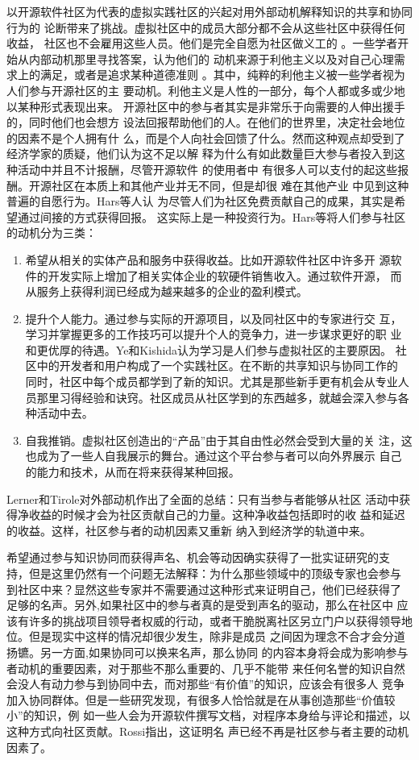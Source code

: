 以开源软件社区为代表的虚拟实践社区的兴起对用外部动机解释知识的共享和协同行为的
论断带来了挑战。虚拟社区中的成员大部分都不会从这些社区中获得任何收益，
社区也不会雇用这些人员。他们是完全自愿为社区做义工的
\cite{lerner2002sse}。一些学者开始从内部动机那里寻找答案，认为他们的
动机来源于利他主义以及对自己心理需求上的满足，或者是追求某种道德准则
\cite{Wu2007}。其中，纯粹的利他主义被一些学者视为人们参与开源社区的主
要动机。利他主义是人性的一部分，每个人都或多或少地以某种形式表现出来。
开源社区中的参与者其实是非常乐于向需要的人伸出援手的，同时他们也会想方
设法回报帮助他们的人。在他们的世界里，决定社会地位的因素不是个人拥有什
么，而是个人向社会回馈了什么\cite{raymond1999cab}。然而这种观点却受到了经济学家的质疑，他们认为这不足以解
释为什么有如此数量巨大参与者投入到这种活动中并且不计报酬，尽管开源软件
的使用者中
有很多人可以支付的起这些报酬。开源社区在本质上和其他产业并无不同，但是却很
难在其他产业 中见到这种普遍的自愿行为\cite{schmidt2002pso}。Hars等人认
为尽管人们为社区免费贡献自己的成果，其实是希望通过间接的方式获得回报。
这实际上是一种投资行为\cite{hars2002wfm}。Hars等将人们参与社区的动机分为三类：
\begin{enumerate}
\item  希望从相关的实体产品和服务中获得收益。比如开源软件社区中许多开
  源软件的开发实际上增加了相关实体企业的软硬件销售收入。通过软件开源，
  而从服务上获得利润已经成为越来越多的企业的盈利模式。
\item 提升个人能力。通过参与实际的开源项目，以及同社区中的专家进行交
  互，学习并掌握更多的工作技巧可以提升个人的竞争力，进一步谋求更好的职
  业和更优厚的待遇。Ye和Kishida认为学习是人们参与虚拟社区的主要原因。
  社区中的开发者和用户构成了一个实践社区。在不断的共享知识与协同工作的
  同时，社区中每个成员都学到了新的知识。尤其是那些新手更有机会从专业人
  员那里习得经验和诀窍。社区成员从社区学到的东西越多，就越会深入参与各
  种活动中去\cite{1201220}。
\item 自我推销。虚拟社区创造出的“产品”由于其自由性必然会受到大量的关
  注，这也成为了一些人自我展示的舞台。通过这个平台参与者可以向外界展示
  自己的能力和技术，从而在将来获得某种回报。
\end{enumerate}
Lerner和Tirole对外部动机作出了全面的总结：只有当参与者能够从社区
活动中获得净收益的时候才会为社区贡献自己的力量。这种净收益包括即时的收
益和延迟的收益\cite{lerner2002sse}。这样，社区参与者的动机因素又重新
纳入到经济学的轨道中来。

希望通过参与知识协同而获得声名、机会等动因确实获得了一批实证研究的支
持，但是这里仍然有一个问题无法解释：为什么那些领域中的顶级专家也会参与
到社区中来？显然这些专家并不需要通过这种形式来证明自己，他们已经获得了
足够的名声。另外,如果社区中的参与者真的是受到声名的驱动，那么在社区中
应该有许多的挑战项目领导者权威的行动，或者干脆脱离社区另立门户以获得领导地
位\cite{WeberWeberSteven}。但是现实中这样的情况却很少发生，除非是成员
之间因为理念不合才会分道扬镳。另一方面,如果协同可以换来名声，那么协同
的内容本身将会成为影响参与者动机的重要因素，对于那些不那么重要的、几乎不能带
来任何名誉的知识自然会没人有动力参与到协同中去，而对那些“有价值”的知识，应该会有很多人
竞争加入协同群体。但是一些研究发现，有很多人恰恰就是在从事创造那些“价值较小”的知识，例
如一些人会为开源软件撰写文档，对程序本身给与评论和描述，以这种方式向社区贡献。Rossi指出，这证明名
声已经不再是社区参与者主要的动机因素了\cite{Rossi2004}。

